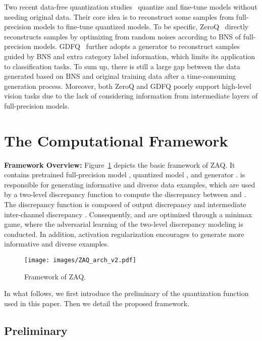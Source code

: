 \documentclass[final]{cvpr}
\begin{document}
Two recent data-free quantization studies~\cite{cai2020zeroq,xu2020generative} quantize and fine-tune models without needing original data. 
Their core idea is to reconstruct some samples from full-precision models to fine-tune quantized models. 
To be specific, ZeroQ~\cite{cai2020zeroq} directly reconstructs samples by optimizing from random noises according to BNS of full-precision models.
GDFQ~\cite{xu2020generative} further adopts a generator to reconstruct samples guided by BNS and extra category label information, which limits its application to classification tasks. 
To sum up, there is still a large gap between the data generated based on BNS and original training data after a time-consuming generation process.
Moreover, both ZeroQ and GDFQ poorly support high-level vision tasks due to the lack of considering information from intermediate layers of full-precision models.




\section{The Computational Framework}

\textbf{Framework Overview:} Figure~\ref{fig:ZAQ} depicts the basic framework of ZAQ. 
It contains pretrained full-precision model , quantized model , and generator .
 is responsible for generating informative and diverse data examples, which are used by a two-level discrepancy function to compute the discrepancy between  and .
The discrepancy function is composed of output discrepancy  and intermediate inter-channel discrepancy .
Consequently,  and  are optimized through a minimax game, where the adversarial learning of the two-level discrepancy modeling is conducted.
In addition, activation regularization  encourages  to generate more informative and diverse examples.

\begin{figure}[!t]
  \centering
  \texttt{[image: images/ZAQ\_arch\_v2.pdf]}
  \caption{Framework of ZAQ.}
  \label{fig:ZAQ}
\end{figure}

In what follows, we first introduce the preliminary of the quantization function used in this paper.
Then we detail the proposed framework.

\subsection{Preliminary}
\end{document}
